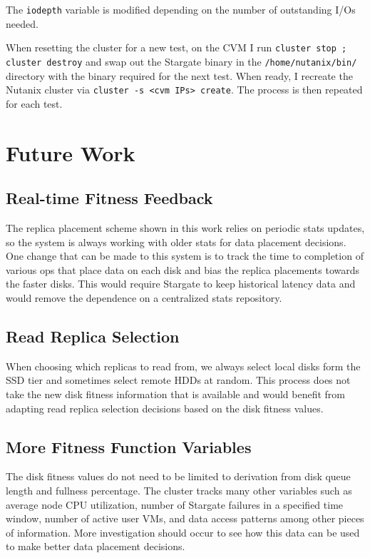 \documentclass[12pt]{article}
\begin{document}
  The \verb|iodepth| variable is modified depending on the number of
  outstanding I/Os needed.

  When resetting the cluster for a new test, on the CVM I run
  \verb|cluster stop ; cluster destroy| and swap out the Stargate binary in
  the \verb|/home/nutanix/bin/| directory with the binary required for the next
  test. When ready, I recreate the Nutanix cluster via
  \verb|cluster -s <cvm IPs> create|. The process is then repeated for each
  test.

\section{Future Work}

  \subsection{Real-time Fitness Feedback}

  The replica placement scheme shown in this work relies on periodic stats
  updates, so the system is always working with older stats for data placement
  decisions. One change that can be made to this system is to track the time to
  completion of various ops that place data on each disk and bias the replica
  placements towards the faster disks. This would require Stargate to keep
  historical latency data and would remove the dependence on a centralized
  stats repository.

  \subsection{Read Replica Selection}

  When choosing which replicas to read from, we always select local disks
  form the SSD tier and sometimes select remote HDDs at random. This process
  does not take the new disk fitness information that is available and would
  benefit from adapting read replica selection decisions based on the disk
  fitness values.

  \subsection{More Fitness Function Variables}

  The disk fitness values do not need to be limited to derivation from disk
  queue length and fullness percentage. The cluster tracks many other variables
  such as average node CPU utilization, number of Stargate failures in a
  specified time window, number of active user VMs, and data access patterns
  among other pieces of information. More investigation should occur to see how
  this data can be used to make better data placement decisions.
\end{document}
